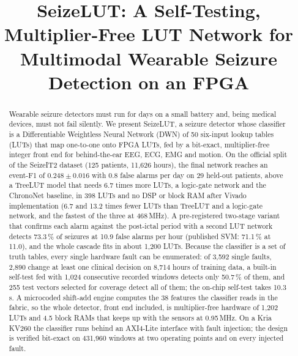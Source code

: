 \documentclass[conference]{IEEEtran}
\begin{document}
\title{SeizeLUT: A Self-Testing, Multiplier-Free LUT Network for Multimodal Wearable Seizure Detection on an FPGA}
\author{\IEEEauthorblockN{[Authors]}}
\maketitle

\begin{abstract}
Wearable seizure detectors must run for days on a small battery and, being medical devices, must not fail
silently. We present SeizeLUT, a seizure detector whose classifier is a Differentiable Weightless Neural Network
(DWN) of 50 six-input lookup tables (LUTs) that map one-to-one onto FPGA LUTs, fed by a bit-exact, multiplier-free
integer front end for behind-the-ear EEG, ECG, EMG and motion. On the official split of the SeizeIT2 dataset (125
patients, 11,626 hours), the final network reaches an event-F1 of $0.248 \pm 0.016$ with 0.8 false alarms per day
on 29 held-out patients, above a TreeLUT model that needs 6.7 times more LUTs, a logic-gate network and the
ChronoNet baseline, in 398 LUTs and no DSP or block RAM after Vivado implementation (6.7 and 13.2 times fewer LUTs
than TreeLUT and a logic-gate network, and the fastest of the three at 468\,MHz). A pre-registered two-stage variant that
confirms each alarm against the post-ictal period with a second LUT network detects 73.3\,\% of seizures at 10.9
false alarms per hour (published SVM: 71.1\,\% at 11.0), and the whole cascade fits in about 1,200 LUTs. Because the
classifier is a set of truth tables, every single hardware fault can be enumerated: of 3,592 single faults, 2,890
change at least one clinical decision on 8,714 hours of training data, a built-in self-test fed with 1,024
consecutive recorded windows detects only 50.7\,\% of them, and 255 test vectors selected for coverage detect all of
them; the on-chip self-test takes 10.3\,\textmu s. A microcoded shift-add engine computes the 38 features the
classifier reads in the fabric, so the whole detector, front end included, is multiplier-free hardware of 1,202 LUTs
and 4.5 block RAMs that keeps up with the sensors at 0.95\,MHz. On a Kria KV260 the classifier runs behind an
AXI4-Lite interface with fault injection; the design is verified bit-exact on 431,960 windows at two operating
points and on every injected fault.
\end{abstract}
\end{document}
